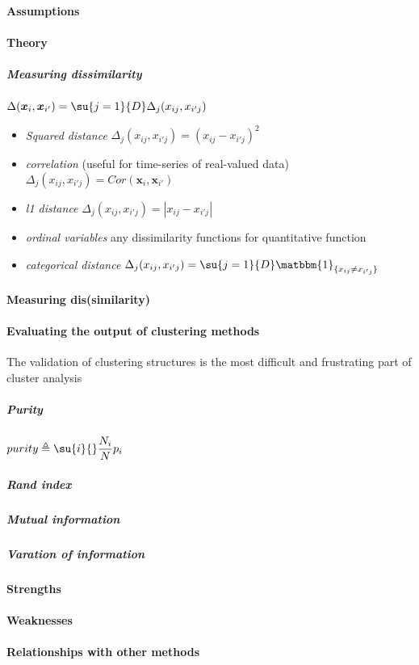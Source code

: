 \paragraph{Assumptions}
\paragraph{Theory}
\subparagraph{Measuring dissimilarity}
$\Delta(\bm{x}_{i}, \bm{x}_{i'}) = \su{j=1}{D}\Delta_{j}(x_{ij},x_{i'j})$
\begin{itemize}
    \item \emph{Squared distance} $\Delta_{j}(x_{ij},x_{i'j}) = (x_{ij}-x_{i'j})^{2}$
    \item \emph{correlation} (useful for time-series of real-valued data) 
        $\Delta_{j}(x_{ij},x_{i'j}) = Cor(\bm{x}_{i},\bm{x}_{i'})$
    \item \emph{l1 distance} $\Delta_{j}(x_{ij},x_{i'j}) = |x_{ij}-x_{i'j}|$
    \item \emph{ordinal variables} any dissimilarity functions for quantitative function
    \item \emph{categorical distance} $\Delta_{j}(x_{ij},x_{i'j}) = \su{j=1}{D}\matbbm{1}_{\{x_{ij}
        \neq x_{i'j}\}}$
\end{itemize}

\paragraph{Measuring dis(similarity)}
\paragraph{Evaluating the output of clustering methods}
The validation of clustering structures is the most difficult and frustrating part of cluster
analysis
\subparagraph{Purity}
$purity\triangleq \su{i}{}\dfrac{N_{i}}{N}p_{i}$
\subparagraph{Rand index}
\subparagraph{Mutual information}
\subparagraph{Varation of information}

\paragraph{Strengths}
\paragraph{Weaknesses}
\paragraph{Relationships with other methods}
